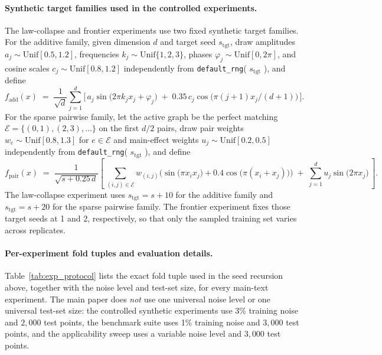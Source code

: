 \documentclass{article}
\newcommand{\add}{\mathrm{add}}
\newcommand{\pair}{\mathrm{pair}}
\begin{document}
\paragraph{Synthetic target families used in the controlled experiments.}
The law-collapse and frontier experiments use two fixed synthetic target families. For the additive family, given dimension $d$ and target seed $s_{\mathrm{tgt}}$, draw amplitudes $a_j\sim\mathrm{Unif}[0.5,1.2]$, frequencies $k_j\sim\mathrm{Unif}\{1,2,3\}$, phases $\varphi_j\sim\mathrm{Unif}[0,2\pi]$, and cosine scales $c_j\sim\mathrm{Unif}[0.8,1.2]$ independently from \texttt{default\_rng}( $s_{\mathrm{tgt}}$ ), and define
\begin{equation}
    f_{\add}(x) \;=\; \frac{1}{\sqrt{d}}\sum_{j=1}^{d} \Big[\, a_j \sin\!\bigl(2\pi k_j x_j + \varphi_j\bigr) \;+\; 0.35\, c_j \cos\!\bigl(\pi (j+1) x_j / (d+1)\bigr)\,\Big].
    \label{eq:f_add}
\end{equation}
For the sparse pairwise family, let the active graph be the perfect matching $\mathcal{E}=\{(0,1),(2,3),\dots\}$ on the first $d/2$ pairs, draw pair weights $w_e\sim\mathrm{Unif}[0.8,1.3]$ for $e\in\mathcal{E}$ and main-effect weights $u_j\sim\mathrm{Unif}[0.2,0.5]$ independently from \texttt{default\_rng}( $s_{\mathrm{tgt}}$ ), and define
\begin{equation}
    f_{\pair}(x) \;=\; \frac{1}{\sqrt{s + 0.25\,d}}\left[\,\sum_{(i,j)\in\mathcal{E}}\! w_{(i,j)}\!\Big(\sin\!\bigl(\pi x_i x_j\bigr) + 0.4\cos\!\bigl(\pi(x_i + x_j)\bigr)\Big) \;+\; \sum_{j=1}^{d} u_j \sin\!\bigl(2\pi x_j\bigr)\,\right].
    \label{eq:f_pair}
\end{equation}
The law-collapse experiment uses $s_{\mathrm{tgt}}=s+10$ for the additive family and $s_{\mathrm{tgt}}=s+20$ for the sparse pairwise family. The frontier experiment fixes those target seeds at 1 and 2, respectively, so that only the sampled training set varies across replicates.

\paragraph{Per-experiment fold tuples and evaluation details.}
Table~\ref{tab:exp_protocol} lists the exact fold tuple used in the seed recursion above, together with the noise level and test-set size, for every main-text experiment. The main paper does \emph{not} use one universal noise level or one universal test-set size: the controlled synthetic experiments use 3\% training noise and $2{,}000$ test points, the benchmark suite uses 1\% training noise and $3{,}000$ test points, and the applicability sweep uses a variable noise level and $3{,}000$ test points.
\end{document}
